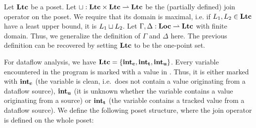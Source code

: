 Let $\textbf{Ltc}$ be a poset.
Let $\mathbin\sqcup: \textbf{Ltc} \times \textbf{Ltc} \rightharpoonup \textbf{Ltc}$ be the (partially defined)
join operator on the poset.
We require that its domain is maximal, i.e. if $L_1, L_2 \in \textbf{Ltc}$ have a least upper
bound, it is $L_1 \mathbin\sqcup L_2$.
Let $\Gamma, \Delta: \textbf{Loc} \rightharpoonup \textbf{Ltc}$ with finite domain.
Thus, we generalize the definition of $\Gamma$ and $\Delta$ here.
The previous definition can be recovered by setting $\textbf{Ltc}$ to be the one-point set.

For dataflow analysis, we have $\textbf{Ltc} = \{\textbf{int}_\textbf{c}, \textbf{int}_\textbf{t}, \textbf{int}_\textbf{u}\}$.
Every variable encountered in the program is marked with a value in \lattice.
Thus, it is either marked with $\textbf{int}_\textbf{c}{}$ (the variable
is clean, i.e.\ does not contain a value originating from a dataflow source), $\textbf{int}_\textbf{u}{}$
(it is unknown whether the variable contains a value originating from a source) or $\textbf{int}_\textbf{t}{}$
(the variable contains a tracked value from a dataflow source).
We define the following poset structure, where the join operator is defined on the whole
poset:
\begin{figure}[h]
    \centering
\end{figure}

